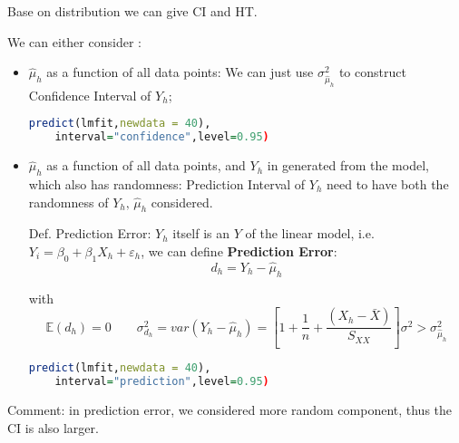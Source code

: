     Base on distribution we can give CI and HT.

\begin{point}
    We can either consider :
\end{point}

    \begin{itemize}[topsep=2pt,itemsep=2pt]
        \item $ \hat{\mu }_h $ as a function of all data points: 
        We can just use $  \sigma ^2_{\hat{\mu}_h} $ to construct Confidence Interval of $ Y_h $;

        \begin{rcode}
\begin{lstlisting}[language=R]
predict(lmfit,newdata = 40),
    interval="confidence",level=0.95)
\end{lstlisting}
        \end{rcode}
        \item $ \hat{\mu }_h $ as a function of all data points, and $ Y_h $ in generated from the model, which also has randomness: Prediction Interval of $ Y_h $ need to  have both the randomness of $ Y_h,\,\hat{\mu }_h $ considered.

        Def. Prediction Error: $ Y_h $ itself is an $ Y $ of the linear model, i.e. $ Y_i=\beta_0+\beta_1X_h+\varepsilon _h $, we can define \textbf{Prediction Error}: 
        \begin{equation}
            d_h=Y_h-\hat{\mu}_h 
        \end{equation}
    
        with
        \begin{equation}
            \mathbb{E}(d_h)=0\qquad \sigma^2_{d_h}=var(Y_h-\hat{\mu }_h)=\left[ 1+\dfrac{1}{n}+\dfrac{(X_h-\bar{X})}{S_{XX}} \right]\sigma^2 > \sigma ^2_{\hat{\mu}_h}
        \end{equation}
\begin{rcode}
\begin{lstlisting}[language=R]
predict(lmfit,newdata = 40),
    interval="prediction",level=0.95)
\end{lstlisting}
\end{rcode}
    
    \end{itemize}

    Comment: in prediction error, we considered more random component, thus the CI is also larger.
    
    


